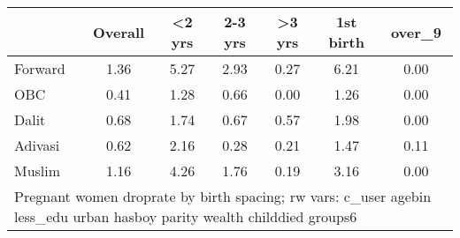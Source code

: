 \begin{tabular}{l*{6}{c}}
\toprule
            &\multicolumn{1}{c}{Overall}&\multicolumn{1}{c}{<2 yrs}&\multicolumn{1}{c}{2-3 yrs}&\multicolumn{1}{c}{>3 yrs}&\multicolumn{1}{c}{1st birth}&\multicolumn{1}{c}{over\_9}\\
\midrule
\midrule
Forward     &        1.36&        5.27&        2.93&        0.27&        6.21&        0.00\\
OBC         &        0.41&        1.28&        0.66&        0.00&        1.26&        0.00\\
Dalit       &        0.68&        1.74&        0.67&        0.57&        1.98&        0.00\\
Adivasi     &        0.62&        2.16&        0.28&        0.21&        1.47&        0.11\\
Muslim      &        1.16&        4.26&        1.76&        0.19&        3.16&        0.00\\
\bottomrule
\multicolumn{7}{l}{\footnotesize Pregnant women droprate by birth spacing; rw vars: c\_user agebin less\_edu urban hasboy parity wealth childdied groups6}\\
\end{tabular}
